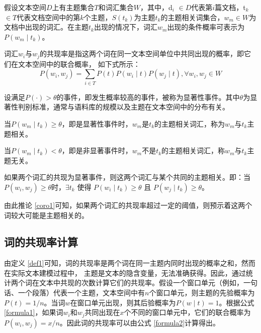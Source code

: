 假设文本空间\(D\)上有主题集合\(T\)和词汇集合\(W\)，其中，d\(_i\)
\(\in D\)代表第\(i\)篇文档，t\(_k\)
\(\in T\)代表文档空间中的第\(k\)个主题，\(S(t_k)\)为主题\(t_k\)的主题相关词集合，\(w_m \in W\)为文档中出现的词汇。在主题\(t_k\)出现的情况下，词汇\(w_m\)出现的条件概率可表示为\(P(w_m \mid t_k)\)。

\begin{definition}[共现率]
词汇$w_i$与$w_j$的共现率是指这两个词在同一文本空间单位中共同出现的概率，即它们在文本空间中的联合概率， \label{def1}如下式所示：
\begin{equation}
P(w_i, w_j) = \sum_{i \in T}P(t) P(w_i \mid t)P(w_j \mid t), \forall w_i, w_j \in W
\label{formula1}
\end{equation} 
\end{definition}

\begin{definition}[显著性事件]
设满足$P(\cdot) > \theta$的事件，即发生概率较高的事件，被称为显著性事件。其中$\theta$为显著性判别标准，通常与语料库的规模以及主题在文本空间中的分布有关。 \label{def2}
\end{definition}

\begin{definition}[主题相关]
当$P(w_m \mid t_k) \geq \theta$，即是显著性事件时，$w_m$是$t_k$的主题相关词汇，称为$w_m$与$t_k$主题相关。
\end{definition}

\label{def3}

\begin{definition}[主题无关]
当$P(w_m \mid t_k) < \theta$，即是非显著事件时，$w_m$不是$t_k$的主题相关词汇，称$w_m$与$t_k$主题无关。 \label{def4}
\end{definition}

\begin{corollary}
如果两个词汇的共现为显著事件，则这两个词汇与某个共同的主题相关。即：当$P(w_i, w_j) \geq \theta$时，$\exists t_k$ 使得 $P(w_i \mid t_k) \geq \theta$ 且 $P(w_j \mid t_k) \geq \theta$。 \label{coro1}
\end{corollary}

由此推论
\ref{coro1}可知，如果两个词汇的共现率超过一定的阈值，则预示着这两个词较大可能是主题相关的。

\subsection{词的共现率计算}\label{ux8bcdux7684ux5171ux73b0ux7387ux8ba1ux7b97}

由定义
\ref{def1}可知，词的共现率是两个词在同一主题内同时出现的概率之和，然而在实际文本建模过程中，
主题是文本的隐含变量，无法准确获得。因此，通过统计两个词在文本中共现的次数计算它们的共现率。假设一个窗口单元（例如，一句话、一个段落）代表一个主题，文本空间中有\(n\)个窗口单元，则主题的先验概率为\(P(t) = 1 / n\)。当词\(w\)在窗口单元出现，则其后验概率为\(P(w \mid t) = 1\)。根据公式
\ref{formula1}，如果词\(w_i\)和\(w_j\)共同出现在\(x\)个不同的窗口单元中，它们的联合概率为\(P(w_i, w_j)= x / n\)。因此词的共现率可以由公式
\ref{formula2}计算得出。

